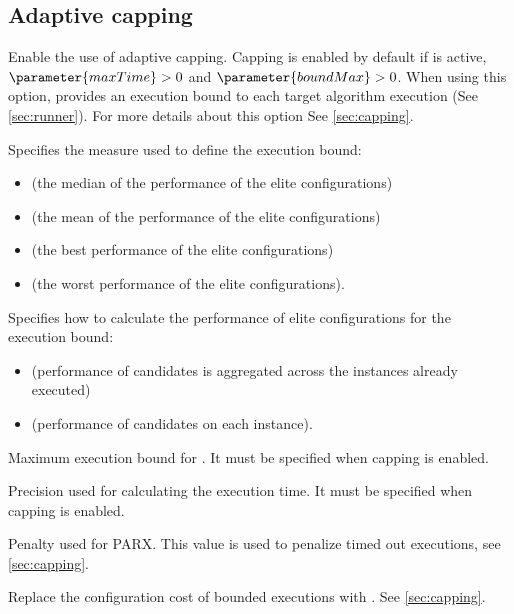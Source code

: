 \subsection[Adaptive capping]{Adaptive capping}
\begin{description}
Enable the use of adaptive capping. Capping is enabled by default if  is active, $\parameter{maxTime} > 0$ and  $\parameter{boundMax} > 0$. When using this option, \irace provides an execution bound to each target algorithm execution (See \autoref{sec:runner}). For more details about this option See \autoref{sec:capping}.

 Specifies the measure used to define the execution bound:
\begin{itemize}
\item[]  (the median of the performance of the elite configurations)
\item[]  (the mean of the performance of the elite configurations)
\item[]  (the best performance of the elite configurations)
\item[]  (the worst performance of the elite configurations).
\end{itemize}

Specifies how to calculate the performance of elite configurations for the execution bound:
\begin{itemize}
\item[]  (performance of candidates is aggregated across the instances already executed)
\item[]  (performance of candidates on each instance).
\end{itemize}

Maximum execution bound for . It must be specified when capping is enabled.

Precision used for calculating the execution time. It must be specified when capping is enabled.

Penalty used for PARX. This value is used to penalize timed out executions, see \autoref{sec:capping}.

Replace the configuration cost of bounded executions with . See \autoref{sec:capping}.

\end{description}

